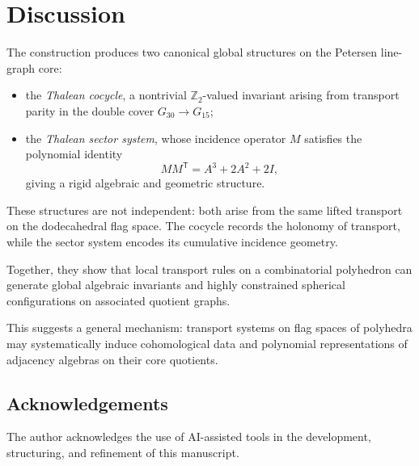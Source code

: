 \section{Discussion}

The construction produces two canonical global structures on the
Petersen line-graph core:

\begin{itemize}
\item the \emph{Thalean cocycle}, a nontrivial
$\mathbb{Z}_2$-valued invariant arising from transport parity in the
double cover $G_{30}\to G_{15}$;

\item the \emph{Thalean sector system}, whose incidence operator $M$
satisfies the polynomial identity
\[
M M^{\mathsf T} = A^3 + 2A^2 + 2I,
\]
giving a rigid algebraic and geometric structure.
\end{itemize}

These structures are not independent: both arise from the same lifted
transport on the dodecahedral flag space. The cocycle records the
holonomy of transport, while the sector system encodes its cumulative
incidence geometry.

Together, they show that local transport rules on a combinatorial
polyhedron can generate global algebraic invariants and highly
constrained spherical configurations on associated quotient graphs.

This suggests a general mechanism: transport systems on flag spaces of
polyhedra may systematically induce cohomological data and polynomial
representations of adjacency algebras on their core quotients.

\subsection*{Acknowledgements}

The author acknowledges the use of AI-assisted tools in the development,
structuring, and refinement of this manuscript.
